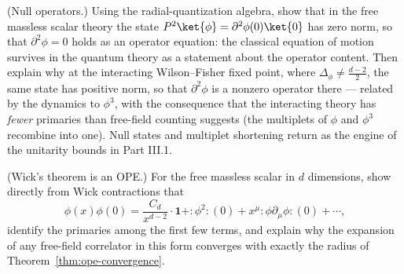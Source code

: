 \begin{exercise}[medium]
\label{exr:null-operators}
(Null operators.) Using the radial-quantization algebra, show that in the
free massless scalar theory the state $P^2\ket{\phi} =
\partial^2\phi(0)\ket{0}$ has zero norm, so that $\partial^2\phi = 0$ holds
as an operator equation: the classical equation of motion survives in the
quantum theory as a statement about the operator content. Then explain why
at the interacting Wilson--Fisher fixed point, where $\Delta_\phi \neq
\frac{d-2}{2}$, the same state has positive norm, so that $\partial^2\phi$
is a nonzero operator there --- related by the dynamics to $\phi^3$, with
the consequence that the interacting theory has \emph{fewer} primaries than
free-field counting suggests (the multiplets of $\phi$ and $\phi^3$
recombine into one). Null states and multiplet shortening return as the
engine of the unitarity bounds in Part III.1.
\end{exercise}

\begin{exercise}[easy]
\label{exr:free-ope}
(Wick's theorem is an OPE.) For the free massless scalar in $d$ dimensions,
show directly from Wick contractions that
\begin{equation*}
\phi(x)\phi(0) = \frac{C_d}{x^{d-2}}\cdot \mathbf{1}
+ {:}\phi^2{:}(0) + x^\mu {:}\phi\partial_\mu \phi{:}(0) + \cdots,
\end{equation*}
identify the primaries among the first few terms, and explain why the
expansion of any free-field correlator in this form converges with exactly
the radius of Theorem~\ref{thm:ope-convergence}.
\end{exercise}

